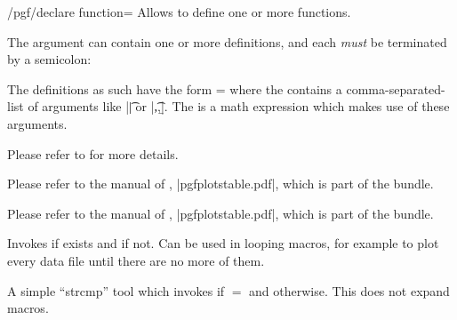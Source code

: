 \begin{key}{/pgf/declare function=}
    Allows to define one or more functions.

    The argument  can contain one or more
    definitions, and each \emph{must} be terminated by a semicolon:
\begin{codeexample}[]
\end{codeexample}
    The definitions as such have the form  =
     where the  contains a
    comma-separated-list of arguments like |\t| or |\t,\a,\b|. The
     is a math expression which makes use of these arguments.

    Please refer to \cite{tikz} for more details.
\end{key}

\begin{command}{\pgfplotstableread{}}
    Please refer to the manual of \PGFPlotstable{}, |pgfplotstable.pdf|, which
    is part of the \PGFPlots{} bundle.
\end{command}

\begin{command}{\pgfplotstabletypeset{}}
    Please refer to the manual of \PGFPlotstable{}, |pgfplotstable.pdf|, which
    is part of the \PGFPlots{} bundle.
\end{command}

\begin{command}{\pgfplotsiffileexists{}}
    Invokes  if  exists and  if
    not. Can be used in looping macros, for example to plot every data file
    until there are no more of them.
\end{command}

\begin{command}{\pgfplotsutilifstringequal{}}
    A simple ``strcmp'' tool which invokes  if 
    $=$ and  otherwise. This does not expand
    macros.
\end{command}

